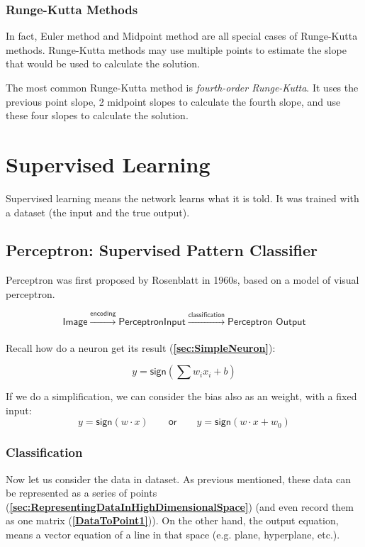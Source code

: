 \documentclass[a4paper, openany]{book}
\begin{document}
\subsubsection{Runge-Kutta Methods}

In fact, Euler method and Midpoint method are all special cases of Runge-Kutta methods. Runge-Kutta methods may use multiple points to estimate the slope that would be used to calculate the solution.

The most common Runge-Kutta method is \textit{fourth-order Runge-Kutta}. It uses the previous point slope, 2 midpoint slopes to calculate the fourth slope, and use these four slopes to calculate the solution.

\section{Supervised Learning}

Supervised learning means the network learns what it is told. It was trained with a dataset (the input and the true output).

\subsection{Perceptron: Supervised Pattern Classifier}

Perceptron was first proposed by Rosenblatt in 1960s, based on a model of visual perceptron.

$$\mathsf{Image} \xrightarrow[]{\textsf{encoding}} \mathsf{Perceptron Input} \xrightarrow[]{\textsf{classification}} \textsf{Perceptron Output}$$

Recall how do a neuron get its result (\textbf{\cref{sec:SimpleNeuron}}):

$$y = \mathsf{sign} (\sum w_i x_i + b)$$

If we do a simplification, we can consider the bias also as an weight, with a fixed input:
$$y = \mathsf{sign} (\textit{w} \cdot \textit{x}) \qquad \mathsf{or} \qquad y = \mathsf{sign} (w \cdot x + w_0)$$

\subsubsection{Classification}

Now let us consider the data in dataset. As previous mentioned, these data can be represented as a series of points (\textbf{\cref{sec:RepresentingDataInHighDimensionalSpace}}) (and even record them as one matrix (\textbf{\cref{DataToPoint1}})). On the other hand, the output equation, means a vector equation of a line in that space (e.g. plane, hyperplane, etc.).
\end{document}
